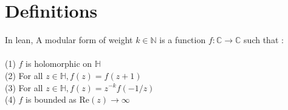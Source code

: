 






\section{Definitions}

\begin{definition} 
  \label{def:ModularForm}
  \leanok
  In lean, A modular form of weight $k \in \mathbb{N}$ is a function $f : \mathbb{C} → \mathbb{C}$ such that : \\ \\
  (1) $f$ is holomorphic on $\mathbb{H}$ \\
  (2) For all $z \in \mathbb{H}, f(z) = f(z + 1)$ \\
  (3) For all $z \in \mathbb{H}, f(z) = z^{-k} f(-1/z)$ \\
  (4) $f$ is bounded as Re$(z) \to \infty$ \\
\end{definition}

